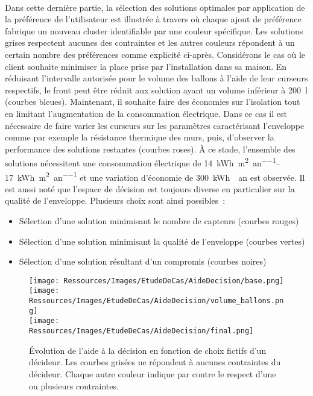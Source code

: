 \paragraph{} %
Dans cette dernière partie, la sélection des solutions optimales par application de la
préférence de l’utilisateur est illustrée à travers  où chaque
ajout de préférence fabrique un nouveau cluster identifiable par une couleur spécifique.
Les solutions grises respectent aucunes des contraintes et les autres couleurs répondent à
un certain nombre des préférences comme explicité ci-après. Considérons le cas où le
client souhaite minimiser la place prise par l’installation dans sa maison. En réduisant
l’intervalle autorisée pour le volume des ballons à l’aide de leur curseurs respectifs, le
front peut être réduit aux solution ayant un volume inférieur à \SI{200}{\litre} (courbes
bleues). Maintenant, il souhaite faire des économies sur l’isolation tout en limitant
l’augmentation de la consommation électrique. Dans ce cas il est nécessaire de faire
varier les curseurs sur les paramètres caractérisant l’enveloppe comme par exemple la
résistance thermique des murs, puis, d’observer la performance des solutions restantes
(courbes roses). À ce stade, l’ensemble des solutions nécessitent une consommation
électrique de \SIrange{14}{17}{kWh\per\m^{2}\per an} et une variation d’économie de
\SI{300}{kWh \per an} est observée. Il est aussi noté que l’espace de décision est
toujours diverse en particulier sur la qualité de l’enveloppe. Plusieurs choix sont ainsi
possibles~:
\begin{itemize}
  \item Sélection d’une solution minimisant le nombre de capteurs (courbes rouges)
  \item Sélection d’une solution minimisant la qualité de l’enveloppe (courbes vertes)
  \item Sélection d’une solution résultant d’un compromis (courbes noires)
\end{itemize}

\begin{figure}
    \centering
    \texttt{[image: Ressources/Images/EtudeDeCas/AideDecision/base.png]}
    \\
    \texttt{[image: Ressources/Images/EtudeDeCas/AideDecision/volume\_ballons.png]}
    \\
    \texttt{[image: Ressources/Images/EtudeDeCas/AideDecision/final.png]}
    \caption[Évolution de l’aide à la décision en fonction de choix fictif d’un décideur]
             {Évolution de l’aide à la décision en fonction de choix fictifs d’un décideur. Les courbes grisées ne répondent à
             aucunes contraintes du décideur. Chaque autre couleur indique par contre le respect d’une ou plusieurs contraintes.}
    \label{fig:xdat_exemple}
\end{figure}

